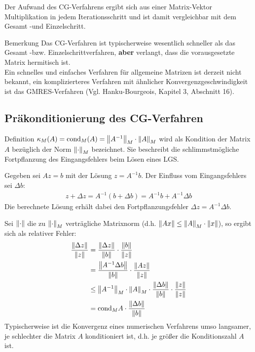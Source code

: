 Der Aufwand des CG-Verfahrens ergibt sich aus einer Matrix-Vektor Multiplikation in jedem Iterationsschritt 
und ist damit vergleichbar mit dem Gesamt -und Einzelschritt.

\begin{colbox}{Bemerkung}
  Das CG-Verfahren ist typischerweise wesentlich schneller als das Gesamt -bzw. Einzelschrittverfahren, 
  \textbf{aber} verlangt, dass die vorausgesetzte Matrix hermitisch ist. \\
  Ein schnelles und einfaches Verfahren für allgemeine Matrizen ist derzeit nicht bekannt, ein komplizierteres 
  Verfahren mit ähnlicher Konvergenzgeschwindigkeit ist das GMRES-Verfahren 
  (Vgl. Hanku-Bourgeois, Kapitel 3, Abschnitt 16). 
\end{colbox}

\subsection{Präkonditionierung des CG-Verfahren}

\begin{colbox}{Definition}
  $\kappa_M(A) = \Cond_M(A) = \vertn{2}{A^{-1}}_M\cdot \vertn{2}{A}_M$ wird als Kondition der Matrix $A$ bezüglich 
  der Norm $\vertn{2}{\cdot}_M$ bezeichnet. 
  Sie beschreibt die schlimmstmögliche Fortpflanzung des Eingangsfehlers beim Lösen eines LGS.
\end{colbox}

Gegeben sei $Az=b$ mit der Lösung $z=A^{-1}b$. Der Einfluss vom Eingangsfehlers sei $\Delta b$:
%
\begin{align*}
  z + \Delta z 
  = A^{-1}(b+\Delta b) 
  = A^{-1}b + A^{-1}\Delta b
\end{align*}
Die berechnete Lösung erhält dabei den Fortpflanzungsfehler $\Delta z = A^{-1}\Delta b$. 

Sei $\vertn{2}{\cdot}$ die zu $\vertn{2}{\cdot}_M$ verträgliche Matrixnorm 
(d.h. $\vertn{2}{Ax}\leq \vertn{2}{A}_M\cdot\vertn{2}{x}$), 
so ergibt sich als relativer Fehler:
%
\begin{align*}
  \dfrac{\vertn{2}{\Delta z}}{\vertn{2}{z}} 
  &= \dfrac{\vertn{2}{\Delta z}}{\vertn{2}{b}} \cdot\dfrac{\vertn{2}{b}}{\vertn{2}{z}} \\
  &= \dfrac{\vertn{2}{A^{-1}\Delta b}}{\vertn{2}{b}} \cdot\dfrac{\vertn{2}{Az}}{\vertn{2}{z}} \\
  &\leq \vertn{2}{A^{-1}}_M \cdot \vertn{2}{A}_M \cdot \dfrac{\vertn{2}{\Delta b}}{\vertn{2}{b}} 
  \cdot \dfrac{\vertn{2}{z}}{\vertn{2}{z}} \\
  &= \Cond_M{A}\cdot\dfrac{\vertn{2}{\Delta b}}{\vertn{2}{b}} \\
\end{align*}
%
Typischerweise ist die Konvergenz eines numerischen Verfahrens umso langsamer, je schlechter die Matrix $A$ 
konditioniert ist, d.h. je größer die Konditionszahl $A$ ist.

